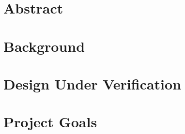 \documentclass{article}
\begin{document}
    \section{Abstract}
    
    \section{Background}
    
    \section{Design Under Verification}

    \section{Project Goals}
    
\end{document}
